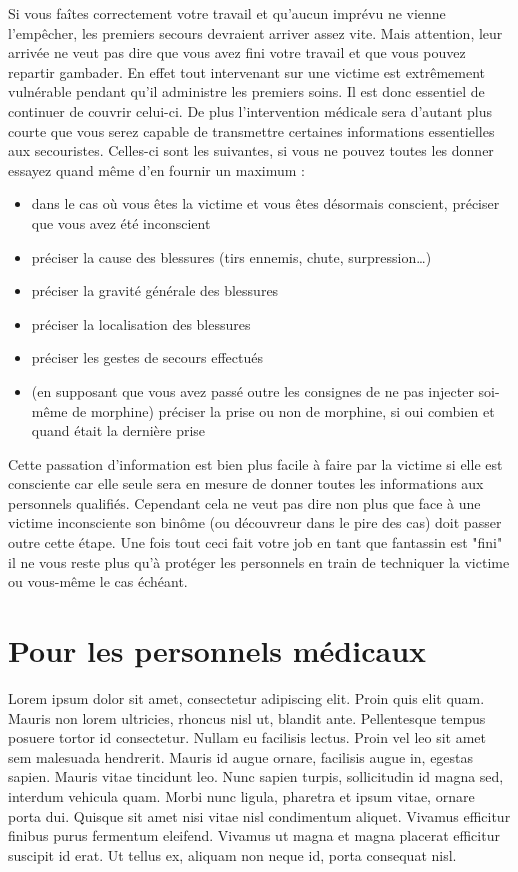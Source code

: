 \documentclass{article}
\begin{document}
			Si vous faîtes correctement votre travail et qu'aucun imprévu ne vienne l'empêcher, les premiers secours devraient arriver assez vite. Mais attention, leur arrivée ne veut pas dire que vous avez fini votre travail et que vous pouvez repartir gambader. En effet tout intervenant sur une victime est extrêmement vulnérable pendant qu'il administre les premiers soins. Il est donc essentiel de continuer de couvrir celui-ci. De plus l'intervention médicale sera d'autant plus courte que vous serez capable de transmettre certaines informations essentielles aux secouristes. Celles-ci sont les suivantes, si vous ne pouvez toutes les donner essayez quand même d'en fournir un maximum :
			\begin{itemize}
				\item dans le cas où vous êtes la victime et vous êtes désormais conscient, préciser que vous avez été inconscient
				\item préciser la cause des blessures (tirs ennemis, chute, surpression\dots)
				\item préciser la gravité générale des blessures
				\item préciser la localisation des blessures
				\item préciser les gestes de secours effectués
				\item (en supposant que vous avez passé outre les consignes de ne pas injecter soi-même de morphine) préciser la prise ou non de morphine, si oui combien et quand était la dernière prise
			\end{itemize}
			Cette passation d'information est bien plus facile à faire par la victime si elle est consciente car elle seule sera en mesure de donner toutes les informations aux personnels qualifiés. Cependant cela ne veut pas dire non plus que face à une victime inconsciente son binôme (ou découvreur dans le pire des cas) doit passer outre cette étape. Une fois tout ceci fait votre job en tant que fantassin est "fini" il ne vous reste plus qu'à protéger les personnels en train de techniquer la victime ou vous-même le cas échéant.
			
		\section{Pour les personnels médicaux}
			Lorem ipsum dolor sit amet, consectetur adipiscing elit. Proin quis elit quam. Mauris non lorem ultricies, rhoncus nisl ut, blandit ante. Pellentesque tempus posuere tortor id consectetur. Nullam eu facilisis lectus. Proin vel leo sit amet sem malesuada hendrerit. Mauris id augue ornare, facilisis augue in, egestas sapien. Mauris vitae tincidunt leo. Nunc sapien turpis, sollicitudin id magna sed, interdum vehicula quam. Morbi nunc ligula, pharetra et ipsum vitae, ornare porta dui. Quisque sit amet nisi vitae nisl condimentum aliquet. Vivamus efficitur finibus purus fermentum eleifend. Vivamus ut magna et magna placerat efficitur suscipit id erat. Ut tellus ex, aliquam non neque id, porta consequat nisl.
			
\end{document}
